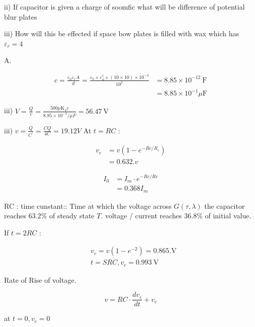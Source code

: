 \documentclass[12pt, a4paper]{article}
\begin{document}
ii) If capacitor is given a charge of soomfic what will be difference of potential blur plates

iii) How will this be effected if space bow plates is filled with wax which has $\varepsilon_{r}=4$

A.

$$
	\begin{aligned}
		c=\frac{\varepsilon_{0} \varepsilon_{r} A}{d}=\frac{\varepsilon_{0} \times \varepsilon_{4}^{1} \times(10 \times 10) \times 10^{-4}}{10^{2}} & =8.85 \times 10^{-12} \mathrm{~F}   \\
		                                                                                                                                            & =8.85 \times 10^{-1} \mu \mathrm{F}
	\end{aligned}
$$

iii) $V=\frac{Q}{c}=\frac{500 \mu \mathrm{K}_{4} c}{8.85 \times 10^{-1} / \mu F}=56.47 \mathrm{~V}$

iii) $v=\frac{Q}{C^{\prime}}=\frac{C Q}{4 C}=19.12 V$
At $t=R C$ :

$$
	\begin{aligned}
		v_{c} & =v\left(1-e^{-R c / R_{c}}\right) \\
		      & =0.632 . v
	\end{aligned}
$$

$$
	\begin{aligned}
		I_{0} & =I_{m} \cdot e^{-R c / R c} \\
		      & =0.368 I_{m}
	\end{aligned}
$$

RC : time cunstant:: Time at which the voltage across $G(\tau, \lambda)$ the capacitor reaches $63.2 \%$ of steady state $T$. voltage / current reaches $36.8 \%$ of initial value.

If $t=2 R C$ :

$$
	\begin{aligned}
		 & v_{c}=v\left(1-e^{-2}\right)=0.865 . \mathrm{V} \\
		 & t=S R C, v_{c}=0.993 \mathrm{~V}
	\end{aligned}
$$

Rate of Rise of voltage.

$$
	v=R C \cdot \frac{d v_{c}}{d t}+v_{c}
$$

at $t=0, v_{c}=0$
\end{document}
